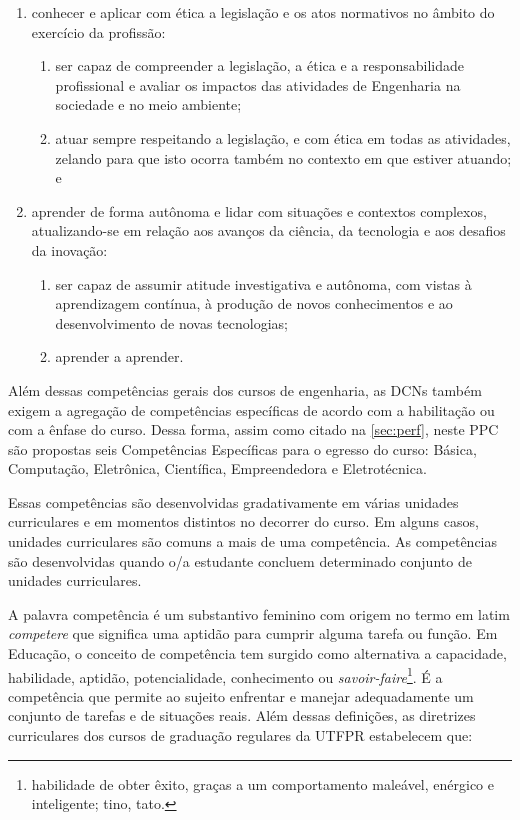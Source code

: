 \begin{citacao}
\begin{enumerate}
        \item conhecer e aplicar com ética a legislação e os atos normativos no âmbito do exercício da profissão:
        \begin{enumerate}
            \item ser capaz de compreender a legislação, a ética e a responsabilidade profissional e avaliar os impactos das atividades de Engenharia na sociedade e no meio ambiente;
            \item atuar sempre respeitando a legislação, e com ética em todas as atividades, zelando para que isto ocorra também no contexto em que estiver atuando; e
        \end{enumerate}

        \item aprender de forma autônoma e lidar com situações e contextos complexos, atualizando-se em relação aos avanços da ciência, da tecnologia e aos desafios da inovação:
        \begin{enumerate}
            \item ser capaz de assumir atitude investigativa e autônoma, com vistas à aprendizagem contínua, à produção de novos conhecimentos e ao desenvolvimento de novas tecnologias;
            \item aprender a aprender.
        \end{enumerate}
    \end{enumerate}
\end{citacao}

Além dessas competências gerais dos cursos de engenharia, as DCNs também exigem a agregação de competências específicas de acordo com a habilitação ou com a ênfase do curso. Dessa forma, assim como citado na \autoref{sec:perf}, neste PPC são propostas seis Competências Específicas para o egresso do curso: Básica, Computação, Eletrônica, Científica, Empreendedora e Eletrotécnica. 


Essas competências são desenvolvidas gradativamente em várias unidades curriculares e em momentos distintos no decorrer do curso. Em alguns casos, unidades curriculares são comuns a mais de uma competência. As competências são desenvolvidas quando o/a estudante concluem determinado conjunto de unidades curriculares. 

A palavra competência é um substantivo feminino com origem no termo em latim \textit{competere} que significa uma aptidão para cumprir alguma tarefa ou função. Em Educação, o conceito de competência tem surgido como alternativa a capacidade, habilidade, aptidão, potencialidade, conhecimento ou \textit{savoir-faire}\footnote{habilidade de obter êxito, graças a um comportamento maleável, enérgico e inteligente; tino, tato.}. É a competência que permite ao sujeito  enfrentar e manejar adequadamente um conjunto de tarefas e de situações reais. Além dessas definições, as diretrizes curriculares dos cursos de graduação regulares da UTFPR \cite{cogep142} estabelecem que:

